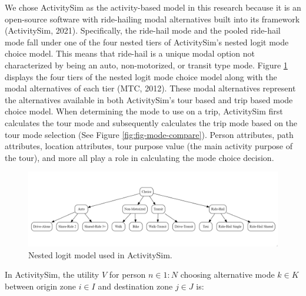 \documentclass[fancy, masters]{byuthesis}
\begin{document}
We chose ActivitySim as the activity-based model in this research because it is an open-source software with ride-hailing modal alternatives built into its framework (ActivitySim, 2021). Specifically, the ride-hail mode and the pooled ride-hail mode fall under one of the four nested tiers of ActivitySim's nested logit mode choice model. This means that ride-hail is a unique modal option not characterized by being an auto, non-motorized, or transit type mode. Figure \ref{fig:fig-asim-nest} displays the four tiers of the nested logit mode choice model along with the modal alternatives of each tier (MTC, 2012). These modal alternatives represent the alternatives available in both ActivitySim's tour based and trip based mode choice model. When determining the mode to use on a trip, ActivitySim first calculates the tour mode and subsequently calculates the trip mode based on the tour mode selection (See Figure \ref{fig:fig-mode-compare}). Person attributes, path attributes, location attributes, tour purpose value (the main activity purpose of the tour), and more all play a role in calculating the mode choice decision.

\begin{figure}
\includegraphics[width = .75\paperwidth]{nestedLogit.png}
\caption{Nested logit model used in ActivitySim.}
\label{fig:fig-asim-nest}
\end{figure}

In ActivitySim, the utility \(V\) for person \(n \in {1:N}\) choosing alternative mode \(k \in K\) between origin zone \(i \in I\) and destination zone \(j \in J\) is:
\end{document}
